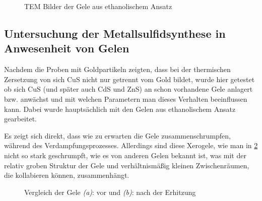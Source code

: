 		\begin{figure}[htbp]
			\centering
			\caption{TEM Bilder der Gele aus ethanolischem Ansatz}
			\label{fig:Gel-E}
		\end{figure}
	
	\subsection{Untersuchung der Metallsulfidsynthese in Anwesenheit von Gelen}
	
	Nachdem die Proben mit Goldpartikeln zeigten, dass bei der thermischen Zersetzung von  sich CuS nicht nur getrennt vom Gold bildet, wurde hier getestet ob sich CuS (und später auch CdS und ZnS) an schon vorhandene Gele anlagert bzw. anwächst und mit welchen Parametern man dieses Verhalten beeinflussen kann.
	Dabei wurde hauptsächlich mit den Gelen aus ethanolischem Ansatz gearbeitet.
	
	Es zeigt sich direkt, dass wie zu erwarten die Gele zusammenschrumpfen, während des Verdampfungsprozesses.
	Allerdings sind diese Xerogele, wie man in \cref{fig:vn} nicht so stark geschrumpft, wie es von anderen Gelen bekannt ist, was mit der relativ groben Struktur der Gele und verhältnismäßig kleinen Zwischenräumen, die kollabieren können, zusammenhängt.
	
	
	\begin{figure}[H]
	\centering
	\caption{Vergleich der Gele \emph{(a)}: vor und \emph{(b)}: nach der Erhitzung}
	\label{fig:vn}
	\end{figure} 


